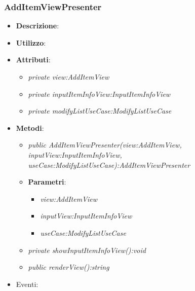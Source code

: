\subsubsection{AddItemViewPresenter}
\begin{itemize}
\item \textbf{Descrizione}: 
\item \textbf{Utilizzo}:
\item \textbf{Attributi}: 
	\begin{itemize}
	\item \textit{private view:AddItemView}\\
	
	\item \textit{private inputItemInfoView:InputItemInfoView}\\

	\item \textit{private modifyListUseCase:ModifyListUseCase}\\

	\end{itemize}
\item \textbf{Metodi}:
	\begin{itemize}
	\item \textit{public AddItemViewPresenter(view:AddItemView, inputView:InputItemInfoView, useCase:ModifyListUseCase):AddItemViewPresenter}	
		\item{\textbf{Parametri}: \begin{itemize}
		\item \textit{view:AddItemView}\\
		
		\item \textit{inputView:InputItemInfoView}\\
		
		\item \textit{useCase:ModifyListUseCase}\\
		
		\end{itemize}}
	\item \textit{private showInputItemInfoView():void}\\

	\item \textit{public renderView():string}\\

	\end{itemize}
\item{Eventi}:
\end{itemize}

